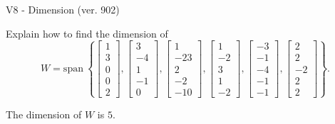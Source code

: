 \begin{exercise}
  \begin{exerciseTitle}V8 - Dimension (ver. 902)\end{exerciseTitle}
  \begin{exerciseStatement}
    Explain how to find the dimension of 
\[W=\mathrm{span}\ \left\{\left[\begin{array}{r}
1 \\
3 \\
0 \\
0 \\
2
\end{array}\right] , \left[\begin{array}{r}
3 \\
-4 \\
1 \\
-1 \\
0
\end{array}\right] , \left[\begin{array}{r}
1 \\
-23 \\
2 \\
-2 \\
-10
\end{array}\right] , \left[\begin{array}{r}
1 \\
-2 \\
3 \\
1 \\
-2
\end{array}\right] , \left[\begin{array}{r}
-3 \\
-1 \\
-4 \\
-1 \\
-1
\end{array}\right] , \left[\begin{array}{r}
2 \\
2 \\
-2 \\
2 \\
2
\end{array}\right]\right\}.\]



  \end{exerciseStatement}
  \begin{exerciseAnswer}
   The dimension of \(W\) is  \(5\).
  


  \end{exerciseAnswer}
\end{exercise}